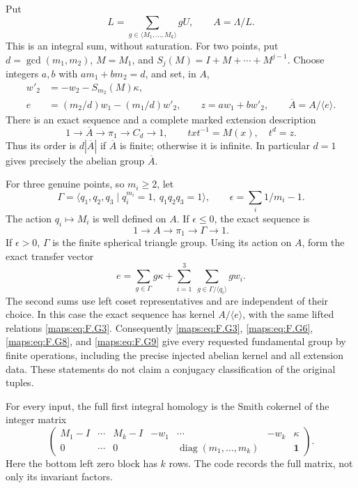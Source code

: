 \begin{theorem}
Put
\[
 L=\sum_{g\in\langle M_1,\ldots,M_k\rangle}gU,
 \qquad A=\Lambda/L.                                      \tag{F.G4}\label{maps:eq:F.G4}
\]
This is an integral sum, without saturation.  For two points, put
$d=\gcd(m_1,m_2)$, $M=M_1$, and
$S_j(M)=I+M+\cdots+M^{j-1}$.  Choose integers $a,b$ with
$am_1+bm_2=d$, and set, in $A$,
\[
 \begin{split}
 w'_2&=-w_2-S_{m_2}(M)\kappa,\\
 e&=(m_2/d)w_1-(m_1/d)w'_2,\qquad
 z=aw_1+bw'_2,\qquad \overline A=A/\langle e\rangle .
 \end{split}                                             \tag{F.G5}\label{maps:eq:F.G5}
\]
There is an exact sequence and a complete marked extension description
\[
 1\longrightarrow\overline A\longrightarrow\pi_1
   \longrightarrow C_d\longrightarrow1,
 \qquad txt^{-1}=M(x),\quad t^d=z.                         \tag{F.G6}\label{maps:eq:F.G6}
\]
Thus its order is $d|\overline A|$ if $\overline A$ is finite;
otherwise it is infinite.  In particular $d=1$ gives precisely
the abelian group $\overline A$.

For three genuine points, so $m_i\ge2$, let
\[
 \Gamma=\langle q_1,q_2,q_3\mid q_i^{m_i}=1,
                         \ q_1q_2q_3=1\rangle,
 \qquad \epsilon=\sum_i1/m_i-1.                           \tag{F.G7}\label{maps:eq:F.G7}
\]
The action $q_i\mapsto M_i$ is well defined on $A$.
If $\epsilon\le0$, the exact sequence is
\[
                    1\longrightarrow A\longrightarrow\pi_1
                         \longrightarrow\Gamma\longrightarrow1. 
 \tag{F.G8}\label{maps:eq:F.G8}
\]
If $\epsilon>0$, $\Gamma$ is the finite spherical triangle group.
Using its action on $A$, form the exact transfer vector
\[
 e=\sum_{g\in\Gamma}g\kappa+
       \sum_{i=1}^3\ \sum_{g\in\Gamma/\langle q_i\rangle}g w_i.
 \tag{F.G9}\label{maps:eq:F.G9}
\]
The second sums use left coset representatives and are independent
of their choice.  In this case the exact sequence has kernel
$A/\langle e\rangle$, with the same lifted relations \eqref{maps:eq:F.G3}.
Consequently \eqref{maps:eq:F.G3}, \eqref{maps:eq:F.G6}, \eqref{maps:eq:F.G8}, and \eqref{maps:eq:F.G9} give every requested
fundamental group by finite operations, including the precise
injected abelian kernel and all extension data.  These statements
do not claim a conjugacy classification of the original tuples.

For every input, the full first integral homology is the Smith
cokernel of the integer matrix
\[
 \begin{pmatrix}
 M_1-I&\cdots&M_k-I&-w_1&\cdots&-w_k&\kappa\\
 0&\cdots&0&&\operatorname{diag}(m_1,\ldots,m_k)&&\boldsymbol1
 \end{pmatrix}.                                           \tag{F.G10}\label{maps:eq:F.G10}
\]
Here the bottom left zero block has $k$ rows.  The code records
the full matrix, not only its invariant factors.

\end{theorem}


